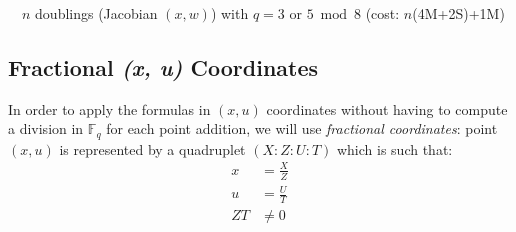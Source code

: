 \documentclass{llncs}
\newcommand{\bF}{\mathbb{F}}
\begin{document}
\begin{algorithm}[H]
    \caption{\ \ $n$ doublings (Jacobian $(x,w)$) with $q = 3$ or $5\bmod 8$ (cost: $n$(4M+2S)+1M)}\label{alg:pointdouble-x:xwJ:2nqr}
    \begin{algorithmic}[1]
        \EndFor
    \end{algorithmic}
\end{algorithm}

\subsection{Fractional \emph{(x, u)} Coordinates}\label{sec:algorithms:xuF}

In order to apply the formulas in $(x, u)$ coordinates without having to
compute a division in $\bF_q$ for each point addition, we will use
\emph{fractional coordinates}: point $(x, u)$ is represented by a
quadruplet $(X{:}Z{:}U{:}T)$ which is such that:
\begin{align*}
    x &= \frac{X}{Z} \\
    u &= \frac{U}{T} \\
    ZT &\neq 0
\end{align*}
\end{document}
